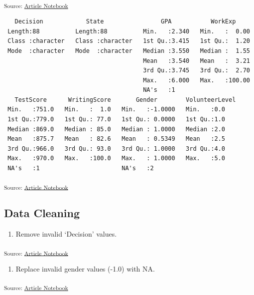 \documentclass[
  letterpaper,
  DIV=11,
  numbers=noendperiod]{scrartcl}
\providecommand{\tightlist}{%
  \setlength{\itemsep}{0pt}\setlength{\parskip}{0pt}}\usepackage{longtable,booktabs,array}
\begin{document}
\textsubscript{Source:
\href{https://verkyyi.github.io/5900-hw1/index.qmd.html}{Article
Notebook}}

\begin{verbatim}
   Decision            State                GPA           WorkExp      
 Length:88          Length:88          Min.   :2.340   Min.   :  0.00  
 Class :character   Class :character   1st Qu.:3.415   1st Qu.:  1.20  
 Mode  :character   Mode  :character   Median :3.550   Median :  1.55  
                                       Mean   :3.540   Mean   :  3.21  
                                       3rd Qu.:3.745   3rd Qu.:  2.70  
                                       Max.   :6.000   Max.   :100.00  
                                       NA's   :1                       
   TestScore      WritingScore       Gender        VolunteerLevel
 Min.   :751.0   Min.   :  1.0   Min.   :-1.0000   Min.   :0.0   
 1st Qu.:779.0   1st Qu.: 77.0   1st Qu.: 0.0000   1st Qu.:1.0   
 Median :869.0   Median : 85.0   Median : 1.0000   Median :2.0   
 Mean   :875.7   Mean   : 82.6   Mean   : 0.5349   Mean   :2.5   
 3rd Qu.:966.0   3rd Qu.: 93.0   3rd Qu.: 1.0000   3rd Qu.:4.0   
 Max.   :970.0   Max.   :100.0   Max.   : 1.0000   Max.   :5.0   
 NA's   :1                       NA's   :2                       
\end{verbatim}

\textsubscript{Source:
\href{https://verkyyi.github.io/5900-hw1/index.qmd.html}{Article
Notebook}}

\subsection{Data Cleaning}\label{data-cleaning}

\begin{enumerate}
\def\labelenumi{\arabic{enumi}.}
\tightlist
\item
  Remove invalid `Decision' values.
\end{enumerate}

\textsubscript{Source:
\href{https://verkyyi.github.io/5900-hw1/index.qmd.html}{Article
Notebook}}

\begin{enumerate}
\def\labelenumi{\arabic{enumi}.}
\setcounter{enumi}{1}
\tightlist
\item
  Replace invalid gender values (-1.0) with NA.
\end{enumerate}

\textsubscript{Source:
\href{https://verkyyi.github.io/5900-hw1/index.qmd.html}{Article
Notebook}}
\end{document}

